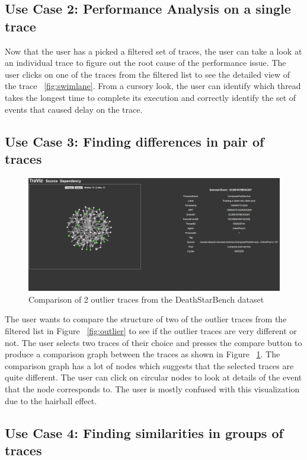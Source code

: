 \subsection{Use Case 2: Performance Analysis on a single trace}

Now that the user has a picked a filtered set of traces, the user
can take a look at an individual trace to figure out the root
cause of the performance issue. The user clicks on one of the
traces from the filtered list to see the detailed view
of the trace ~\ref{fig:swimlane}. From a cursory look,
the user can identify which thread takes the longest time to complete
its execution and correctly identify the set of events that caused delay
on the trace.

\subsection{Use Case 3: Finding differences in pair of traces}

\begin{figure}
    \centering
    \includegraphics[width=\textwidth]{fig/compare}
    \caption{Comparison of 2 outlier traces from the DeathStarBench dataset}
    \label{fig:compare}
\end{figure}

The user wants to compare the structure of two of the outlier traces 
from the filtered list in Figure ~\ref{fig:outlier}
to see if the outlier traces are very different or not. The user selects
two traces of their choice and presses the compare button to produce
a comparison graph between the traces as shown in Figure ~\ref{fig:compare}.
The comparison graph has a lot of nodes which suggests that the selected
traces are quite different. The user can click on circular nodes to
look at details of the event that the node corresponds to.
The user is mostly confused with this visualization due to the hairball effect.

\subsection{Use Case 4: Finding similarities in groups of traces}


